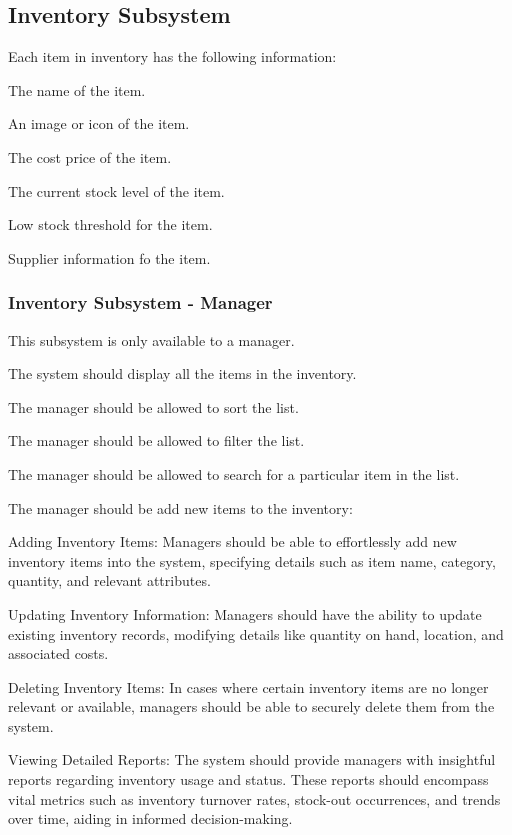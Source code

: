 \documentclass{article}
\begin{document}
	\subsection*{Inventory Subsystem}
	\begin{list}{R.}{}
		\item Each item in inventory has the following information:
		\begin{list}{R.}{}
			\item The name of the item. 
			\item An image or icon of the item.
			\item The cost price of the item.
			\item The current stock level of the item.
			\item Low stock threshold for the item.
			\item Supplier information fo the item.
		\end{list}
	\end{list}
	\subsubsection*{Inventory Subsystem - Manager}	
	\begin{list}{R.}{}
		\item This subsystem is only available to a manager. 
		\item The system should display all the items in the inventory.
		\item The manager should be allowed to sort the list.
		\item The manager should be allowed to filter the list.
		\item The manager should be allowed to search for a particular item in the list.
		\item The manager should be add new items to the inventory:
	    \item Adding Inventory Items: Managers should be able to effortlessly add new inventory items into the system, specifying details such as item name, category, quantity, and relevant attributes.
	    \item Updating Inventory Information: Managers should have the ability to update existing inventory records, modifying details like quantity on hand, location, and associated costs.
	    \item Deleting Inventory Items: In cases where certain inventory items are no longer relevant or available, managers should be able to securely delete them from the system.
	    \item Viewing Detailed Reports: The system should provide managers with insightful reports regarding inventory usage and status. These reports should encompass vital metrics such as inventory turnover rates, stock-out occurrences, and trends over time, aiding in informed decision-making.
	\end{list}
\end{document}
